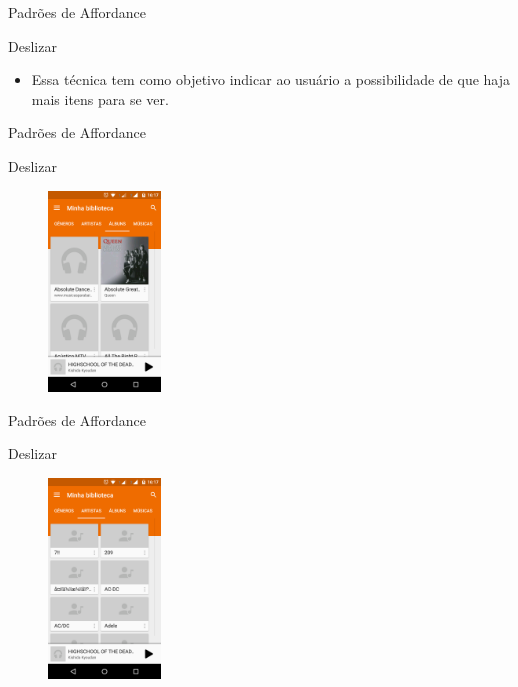 \begin{frame}{Padrões de Affordance}
\begin{block}{Deslizar}
  \begin{itemize}
    \item<1-> Essa técnica tem como objetivo indicar ao usuário a possibilidade de que haja mais itens para se ver.
  \end{itemize}
\end{block}
\end{frame}

\begin{frame}{Padrões de Affordance}
\begin{block}{Deslizar}
    \begin{figure}
    \includegraphics[width=3cm]{figuras/deslize/deslize2}
    \end{figure}
\end{block}
\end{frame}

\begin{frame}{Padrões de Affordance}
\begin{block}{Deslizar}
    \begin{figure}
    \includegraphics[width=3cm]{figuras/deslize/deslize3}
    \end{figure}
\end{block}
\end{frame}

